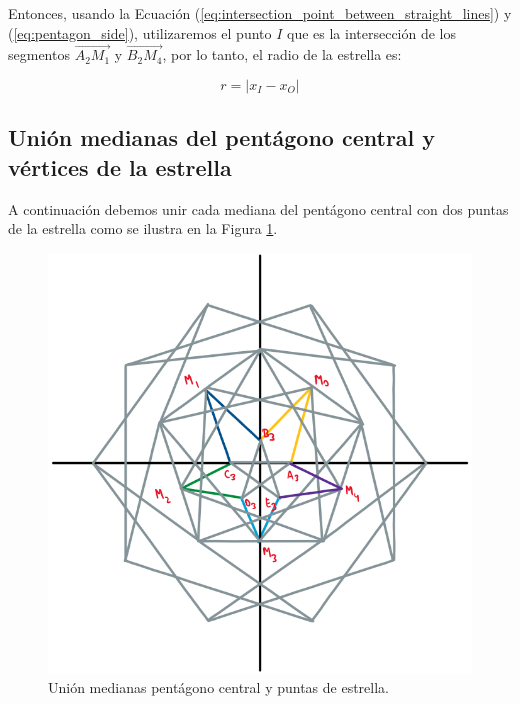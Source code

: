 \documentclass[oneside, a4paper]{article}
\begin{document}
            Entonces, usando la Ecuación (\ref{eq:intersection_point_between_straight_lines}) y (\ref{eq:pentagon_side}), utilizaremos el punto $I$ que es la intersección de los segmentos $\overrightarrow{A_{2}M_{1}}$ y $\overrightarrow{B_{2}M_{4}}$, por lo tanto, el radio de la estrella es:

            \begin{equation}
                r = |x_{I} - x_{O}|
                \label{eq:five_pointed_star_radius}
            \end{equation}

        \subsection{Unión medianas del pentágono central y vértices de la estrella}
            A continuación debemos unir cada mediana del pentágono central con dos puntas de la estrella como se ilustra en la Figura \ref{fig:star_union_to_median}.

            \begin{figure}[H]
                \centering
                \includegraphics[scale=0.5]{star_union_to_median.png}
                \caption{Unión medianas pentágono central y puntas de estrella.}
                \label{fig:star_union_to_median}
            \end{figure}
\end{document}
